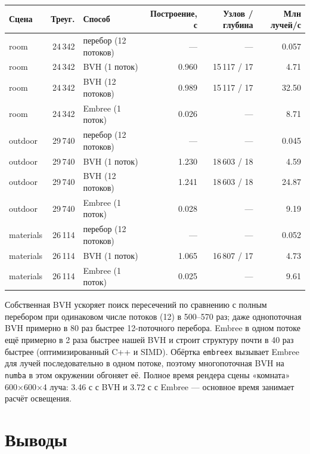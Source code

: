 \documentclass[12pt,a4paper]{article}
\begin{document}
\begin{center}
\small
\begin{tabular}{lrlrrr}
\toprule
Сцена & Треуг. & Способ & Построение, с & Узлов / глубина & Млн лучей/с \\
\midrule
room & 24\,342 & перебор (12 потоков) & — & — & 0.057 \\
room & 24\,342 & BVH (1 поток) & 0.960 & 15\,117 / 17 & 4.71 \\
room & 24\,342 & BVH (12 потоков) & 0.989 & 15\,117 / 17 & 32.50 \\
room & 24\,342 & Embree (1 поток) & 0.026 & — & 8.71 \\
\midrule
outdoor & 29\,740 & перебор (12 потоков) & — & — & 0.045 \\
outdoor & 29\,740 & BVH (1 поток) & 1.230 & 18\,603 / 18 & 4.59 \\
outdoor & 29\,740 & BVH (12 потоков) & 1.241 & 18\,603 / 18 & 24.87 \\
outdoor & 29\,740 & Embree (1 поток) & 0.028 & — & 9.19 \\
\midrule
materials & 26\,114 & перебор (12 потоков) & — & — & 0.052 \\
materials & 26\,114 & BVH (1 поток) & 1.065 & 16\,807 / 17 & 4.73 \\
materials & 26\,114 & Embree (1 поток) & 0.025 & — & 9.61 \\
\bottomrule
\end{tabular}
\end{center}

Собственная BVH ускоряет поиск пересечений по сравнению с полным перебором при одинаковом числе потоков (12)
в 500–570 раз; даже однопоточная BVH примерно в 80 раз быстрее 12-поточного перебора. Embree в одном потоке ещё примерно в 2 раза быстрее нашей BVH и строит структуру почти в
40 раз быстрее (оптимизированный C++ и SIMD). Обёртка \texttt{embreex} вызывает Embree для лучей последовательно в
одном потоке, поэтому многопоточная BVH на \texttt{numba} в этом окружении обгоняет её. Полное время рендера
сцены «комната» 600×600×4 луча: 3.46 с с BVH и 3.72 с с Embree — основное время занимает расчёт освещения.

\section*{Выводы}
\end{document}
